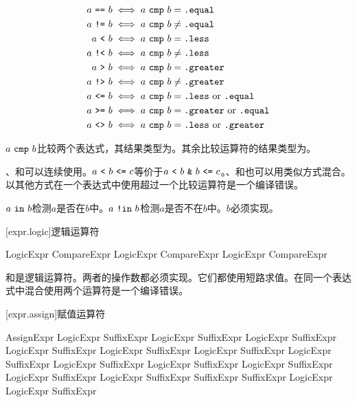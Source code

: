 \begin{align*}
a\ \tcode{==}\ b &\iff a\ \tcode{cmp}\ b = \tcode{.equal} \\
a\ \tcode{!=}\ b &\iff a\ \tcode{cmp}\ b \ne \tcode{.equal} \\
a\ \tcode{<}\ b &\iff a\ \tcode{cmp}\ b = \tcode{.less} \\
a\ \tcode{!<}\ b &\iff a\ \tcode{cmp}\ b \ne \tcode{.less} \\
a\ \tcode{>}\ b &\iff a\ \tcode{cmp}\ b = \tcode{.greater} \\
a\ \tcode{!>}\ b &\iff a\ \tcode{cmp}\ b \ne \tcode{.greater} \\
a\ \tcode{<=}\ b &\iff a\ \tcode{cmp}\ b = \tcode{.less}\ \mathrm{or} \ \tcode{.equal} \\
a\ \tcode{>=}\ b &\iff a\ \tcode{cmp}\ b = \tcode{.greater}\ \mathrm{or} \ \tcode{.equal} \\
a\ \tcode{<>}\ b &\iff a\ \tcode{cmp}\ b = \tcode{.less}\ \mathrm{or} \ \tcode{.greater}
\end{align*}

\pnum
$a\ \tcode{cmp}\ b$比较两个表达式，其结果类型为。其余比较运算符的结果类型为。

\pnum
\tcode{<}、\tcode{<=}和\tcode{==}可以连续使用。$a\ \tcode{<}\ b\ \tcode{<=}\ c$等价于$a\ \tcode{<}\ b\ \tcode{\&}\ b\ \tcode{<=}\ c$。\tcode{>}、\tcode{>=}和\tcode{==}也可以用类似方式混合。以其他方式在一个表达式中使用超过一个比较运算符是一个编译错误。

\pnum
$a\ \tcode{in}\ b$检测$a$是否在$b$中。$a\ \tcode{!in}\ b$检测$a$是否不在$b$中。$b$必须实现。

[expr.logic]{逻辑运算符}

\begin{bnf}{LogicExpr}
    CompareExpr \br
    LogicExpr \terminal{\&} CompareExpr \br
    LogicExpr \terminal{|} CompareExpr
\end{bnf}

\pnum
\tcode{\&}和\tcode{|}是逻辑运算符。两者的操作数都必须实现。它们都使用短路求值。在同一个表达式中混合使用两个运算符是一个编译错误。

[expr.assign]{赋值运算符}

\begin{bnf}{AssignExpr}
    LogicExpr \br
    SuffixExpr \terminal{=} LogicExpr \br
    SuffixExpr \terminal{+=} LogicExpr \br
    SuffixExpr \terminal{-=} LogicExpr \br
    SuffixExpr \terminal{*=} LogicExpr \br
    SuffixExpr \terminal{/=} LogicExpr \br
    SuffixExpr \terminal{\%=} LogicExpr \br
    SuffixExpr  LogicExpr \br
    SuffixExpr  LogicExpr \br
    SuffixExpr  LogicExpr \br
    SuffixExpr  LogicExpr \br
    SuffixExpr  LogicExpr \br
    SuffixExpr \terminal{++} \br
    SuffixExpr \terminal{--} \br
    SuffixExpr \terminal{<\~} LogicExpr \br
    LogicExpr \terminal{\~>} SuffixExpr
\end{bnf}

